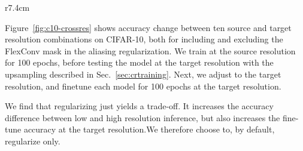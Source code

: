 \documentclass{article} \usepackage{iclr2022_conference,times}
\begin{document}
\setlength\intextsep{0pt}
\begin{wraptable}{r}{7.4cm}
\centering
\caption{Alias-free FlexNets on CIFAR-10.}
\label{tab:crossres}
\vspace{-5mm}
\begin{center}
\end{center}
\vspace{-2mm}
\end{wraptable}

Figure~\ref{fig:c10-crossres} shows accuracy change between ten source and target resolution combinations on CIFAR-10, both for including and excluding the FlexConv mask in the aliasing regularization. We train at the source resolution for 100 epochs, before testing the model at the target resolution with the upsampling described in Sec.~\ref{sec:crtraining}. Next, we adjust  to the target resolution, and finetune each model for 100 epochs at the target resolution.

We find that regularizing just  yields a trade-off. It increases the accuracy difference between low and high resolution inference, but also increases the fine-tune accuracy at the target resolution.We therefore choose to, by default, regularize  only.
\end{document}

